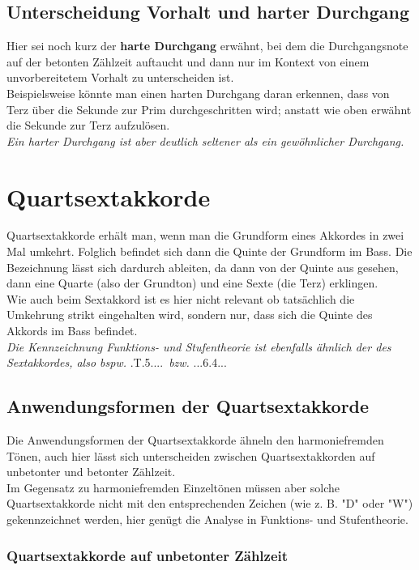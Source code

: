 \documentclass[a4paper]{article}
\newcommand{\dSQS}[1]{\HH.\uppercase\expandafter{\romannumeral #1\relax}..6.4..} %
\newcommand{\TQS}{\HH.T.5....}
\begin{document}
	\subsection{Unterscheidung Vorhalt und harter Durchgang}
	Hier sei noch kurz der \textbf{harte Durchgang} erwähnt, bei dem die Durchgangsnote auf der betonten Zählzeit auftaucht und dann nur im Kontext von einem unvorbereitetem Vorhalt zu unterscheiden ist.\\ Beispielsweise könnte man einen harten Durchgang daran erkennen, dass von Terz über die Sekunde zur Prim durchgeschritten wird; anstatt wie oben erwähnt die Sekunde zur Terz aufzulösen.\\
	\textit{Ein harter Durchgang ist aber deutlich seltener als ein gewöhnlicher Durchgang.}
	
	\section{Quartsextakkorde}
	Quartsextakkorde erhält man, wenn man die Grundform eines Akkordes in zwei Mal umkehrt. Folglich befindet sich dann die Quinte der Grundform im Bass. Die Bezeichnung lässt sich dardurch ableiten, da dann von der Quinte aus gesehen, dann eine Quarte (also der Grundton) und eine Sexte (die Terz) erklingen.\\
	Wie auch beim Sextakkord ist es hier nicht relevant ob tatsächlich die Umkehrung strikt eingehalten wird, sondern nur, dass sich die Quinte des Akkords im Bass befindet.\\
	\textit{Die Kennzeichnung Funktions- und Stufentheorie ist ebenfalls ähnlich der des Sextakkordes, also bspw.} \TQS\ \textit{bzw.} \dSQS{1}.	
	\subsection{Anwendungsformen der Quartsextakkorde}
	Die Anwendungsformen der Quartsextakkorde ähneln den harmoniefremden Tönen, auch hier lässt sich unterscheiden zwischen Quartsextakkorden auf unbetonter und betonter Zählzeit.\\
	Im Gegensatz zu harmoniefremden Einzeltönen müssen aber solche Quartsextakkorde nicht mit den entsprechenden Zeichen (wie z. B. "D"{} oder "W") gekennzeichnet werden, hier genügt die Analyse in Funktions- und Stufentheorie.
	
	\subsubsection{Quartsextakkorde auf unbetonter Zählzeit}
\end{document}
